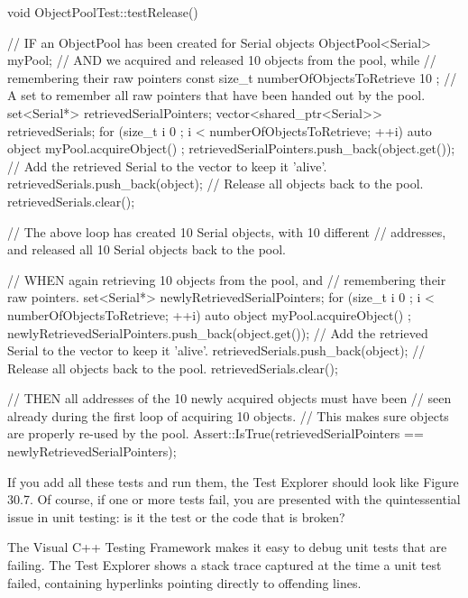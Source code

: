 \begin{cpp}
void ObjectPoolTest::testRelease()
{
    // IF an ObjectPool has been created for Serial objects
    ObjectPool<Serial> myPool;
    // AND we acquired and released 10 objects from the pool, while
    //     remembering their raw pointers
    const size_t numberOfObjectsToRetrieve { 10 };
    // A set to remember all raw pointers that have been handed out by the pool.
    set<Serial*> retrievedSerialPointers;
    vector<shared_ptr<Serial>> retrievedSerials;
    for (size_t i { 0 }; i < numberOfObjectsToRetrieve; ++i) {
        auto object { myPool.acquireObject() };
        retrievedSerialPointers.push_back(object.get());
        // Add the retrieved Serial to the vector to keep it 'alive'.
        retrievedSerials.push_back(object);
    }
    // Release all objects back to the pool.
    retrievedSerials.clear();

    // The above loop has created 10 Serial objects, with 10 different
    // addresses, and released all 10 Serial objects back to the pool.

    // WHEN again retrieving 10 objects from the pool, and
    //      remembering their raw pointers.
    set<Serial*> newlyRetrievedSerialPointers;
    for (size_t i { 0 }; i < numberOfObjectsToRetrieve; ++i) {
        auto object { myPool.acquireObject() };
        newlyRetrievedSerialPointers.push_back(object.get());
        // Add the retrieved Serial to the vector to keep it 'alive'.
        retrievedSerials.push_back(object);
    }
    // Release all objects back to the pool.
    retrievedSerials.clear();

    // THEN all addresses of the 10 newly acquired objects must have been
    //      seen already during the first loop of acquiring 10 objects.
    //      This makes sure objects are properly re-used by the pool.
    Assert::IsTrue(retrievedSerialPointers == newlyRetrievedSerialPointers);
}
\end{cpp}

If you add all these tests and run them, the Test Explorer should look like Figure 30.7. Of course, if one or more tests fail, you are presented with the quintessential issue in unit testing: is it the test or the code that is broken?



The Visual C++ Testing Framework makes it easy to debug unit tests that are failing. The Test Explorer shows a stack trace captured at the time a unit test failed, containing hyperlinks pointing directly to offending lines.

